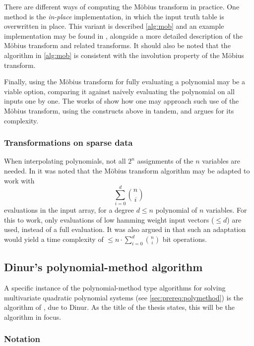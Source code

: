 There are different ways of computing the Möbius transform in practice. One method is the \textit{in-place} implementation, in which the input truth table is overwritten in place. This variant is described \cref{alg:mob} and an example implementation may be found in \cite{joux2009algorithmic}, alongside a more detailed description of the Möbius transform and related transforms. It should also be noted that the algorithm in \cref{alg:mob} is consistent with the involution property of the Möbius transform.

Finally, using the Möbius transform for fully evaluating a polynomial may be a viable option, comparing it against naively evaluating the polynomial on all inputs one by one. The works of \cite{fse-2011-23547} show how one may approach such use of the Möbius transform, using the constructs above in tandem, and argues for its complexity.

\subsubsection{Transformations on sparse data}
When interpolating polynomials, not all $2^n$ assignments of the $n$ variables are needed. In \cite{eurocrypt-2021-30841} it was noted that the Möbius transform algorithm may be adapted to work with 
$$
    \sum_{i = 0}^{d} \binom{n}{i}
$$
evaluations in the input array, for a degree $d \leq n$ polynomial of $n$ variables. For this to work, only evaluations of low hamming weight input vectors ($\leq d$) are used, instead of a full evaluation. It was also argued in \cite{eurocrypt-2021-30841} that such an adaptation would yield a time complexity of $\leq n \cdot \sum_{i = 0}^{d}\binom{n}{i}$ bit operations.

\subsection{Dinur's polynomial-method algorithm}
A specific instance of the polynomial-method type algorithms for solving multivariate quadratic polynomial systems (see \cref{sec:prereq:polymethod}) is the algorithm of \cite{eurocrypt-2021-30841}, due to Dinur. As the title of the thesis states, this will be the algorithm in focus.

\subsubsection{Notation} \label{sec:prereq:dinur:notation}

